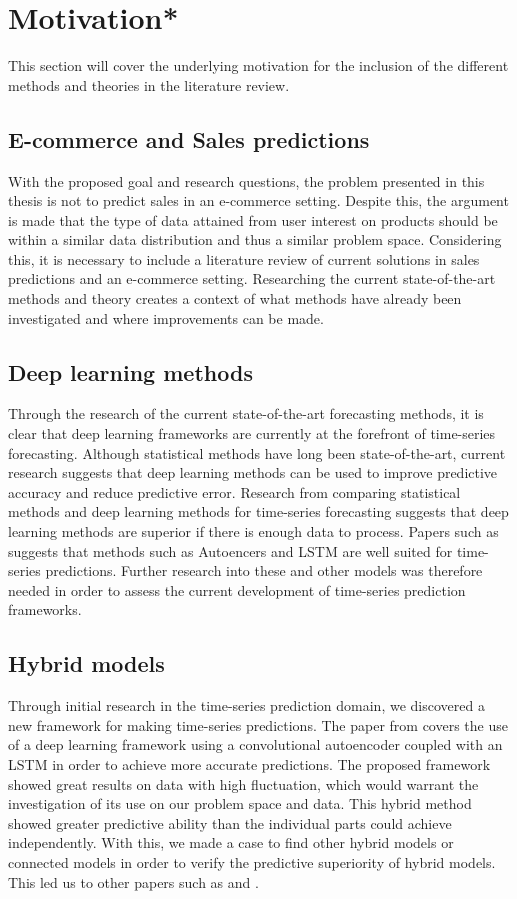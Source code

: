 \section{Motivation*}
\label{section:BT:Motivation}

This section will cover the underlying motivation for the inclusion of the different methods and theories in the literature review.


\subsection{E-commerce and Sales predictions}
With the proposed goal and research questions, the problem presented in this thesis is not to predict sales in an e-commerce setting.
Despite this, the argument is made that the type of data attained from user interest on products should be within a similar data distribution and thus a similar problem space.
Considering this, it is necessary to include a literature review of current solutions in sales predictions and an e-commerce setting.
Researching the current state-of-the-art methods and theory creates a context of what methods have already been investigated and where improvements can be made.


\subsection{Deep learning methods}
Through the research of the current state-of-the-art forecasting methods,
it is clear that deep learning frameworks are currently at the forefront of time-series forecasting.
Although statistical methods have long been state-of-the-art, current research suggests that deep learning methods can be used to improve predictive accuracy and reduce predictive error.
Research from \cite{Makridakis2018} comparing statistical methods and deep learning methods for time-series forecasting suggests that deep learning methods are superior if there is enough data to process.
Papers such as \cite{Laptev} suggests that methods such as Autoencers and LSTM are well suited for time-series predictions.
Further research into these and other models was therefore needed in order to assess the current development of time-series prediction frameworks.


\subsection{Hybrid models}
Through initial research in the time-series prediction domain,
we discovered a new framework for making time-series predictions.
The paper from \cite{Zhao2019} covers the use of a deep learning framework using a convolutional autoencoder
coupled with an LSTM in order to achieve more accurate predictions.
The proposed framework showed great results on data with high fluctuation,
which would warrant the investigation of its use on our problem space and data.
This hybrid method showed greater predictive ability than the individual parts could achieve independently.
With this, we made a case to find other hybrid models or connected models in order to verify the predictive superiority of hybrid models.
This led us to other papers such as \cite{Khan2020} and \cite{Bowen2020}.

